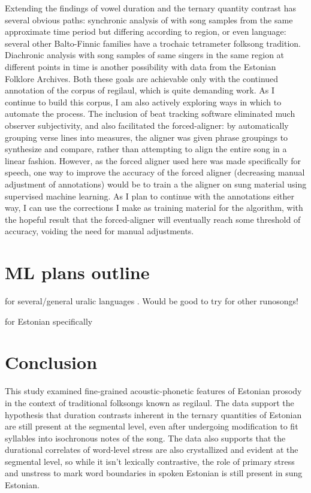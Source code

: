 Extending the findings of vowel duration and the ternary quantity contrast has several obvious paths: synchronic analysis of with song samples from the same approximate time period but differing according to region, or even language: several other Balto-Finnic families have a trochaic tetrameter folksong tradition. Diachronic analysis with song samples of same singers in the same region at different points in time is another possibility with data from the Estonian Folklore Archives. Both these goals are achievable only with the continued annotation of the corpus of regilaul, which is quite demanding work. As I continue to build this corpus, I am also actively exploring ways in which to automate the process. The inclusion of beat tracking software eliminated much observer subjectivity, and also facilitated the forced-aligner: by automatically grouping verse lines into measures, the aligner was given phrase groupings to synthesize and compare, rather than attempting to align the entire song in a linear fashion. However, as the forced aligner used here was made specifically for speech, one way to improve the accuracy of the forced aligner (decreasing manual adjustment of annotations) would be to train a the aligner on sung material using supervised machine learning. As I plan to continue with the annotations either way, I can use the corrections I make as training material for the algorithm, with the hopeful result that the forced-aligner will eventually reach some threshold of accuracy, voiding the need for manual adjustments. 

\section{ML plans outline}


for several/general uralic languages \citep{leinonen2021}. 
Would be good to try for other runosongs! 


for Estonian specifically \citep{ratsep2022}
\section{Conclusion}

This study examined fine-grained acoustic-phonetic features of Estonian prosody in the context of traditional folksongs known as regilaul. The data support the hypothesis that duration contrasts inherent in the ternary quantities of Estonian are still present at the segmental level, even after undergoing modification to fit syllables into isochronous notes of the song. The data also supports that the durational correlates of word-level stress are also crystallized and evident at the segmental level, so while it isn't lexically contrastive, the role of primary stress and unstress to mark word boundaries in spoken Estonian is still present in sung Estonian. 

